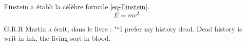\documentclass{article}
\begin{document}
Einstein a établi la célèbre formule \ref{eq-Einstein}.
\begin{equation}
  \label{eq-Einstein}
  E = mc^2
\end{equation}


G.R.R Martin a écrit, dans le livre \cite{GOT4}: "“I prefer my history dead. Dead 
history is writ in ink, the living sort in blood.


\end{document}
